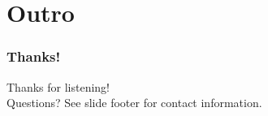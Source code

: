 \documentclass[t]{beamer}
\begin{document}




\section{Outro}

\begin{frame}
	\frametitle{Thanks!}
		\begin{center}
			\vfill
			Thanks for listening!\\
			\vfill
			Questions?
			\vfill
			See slide footer for contact information.
			\vfill
		\end{center}
\end{frame}
\end{document}
